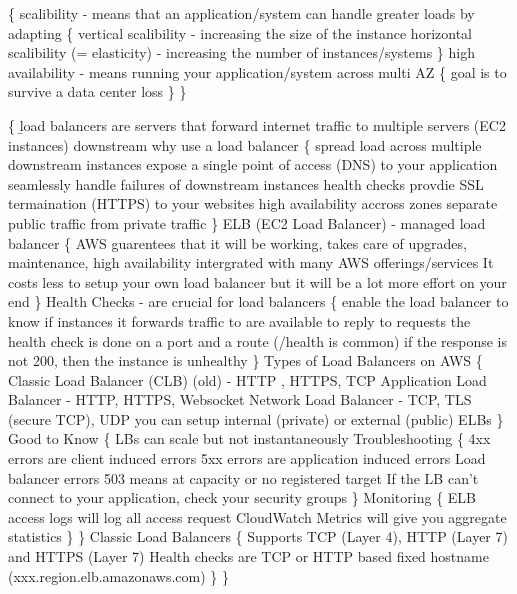  \{
  \> scalibility - means that an application/system can handle greater loads by adapting \{
    \> vertical scalibility - increasing the size of the instance
    \> horizontal scalibility (= elasticity) - increasing the number of instances/systems
  \}
  \> high availability - means running your application/system across multi AZ \{
    \< goal is to survive a data center loss
  \}
  \<
\}

\{
  \> \b{load balancers} are servers that forward internet traffic to multiple servers (EC2 instances) downstream
  \> why use a load balancer \{
    \> spread load across multiple downstream instances
    \> expose a single point of access (DNS) to your application
    \> seamlessly handle failures of downstream instances
    \> health checks
    \> provdie SSL termaination (HTTPS) to your websites
    \> high availability accross zones
    \> separate public traffic from private traffic
    \<
  \}
  \> ELB (EC2 Load Balancer) - managed load balancer \{
    \> AWS guarentees that it will be working, takes care of upgrades, maintenance, high availability
    \> intergrated with many AWS offerings/services
    \> It costs less to setup your own load balancer but it will be a lot more effort on your end 
    \<
  \}
  \> Health Checks - are crucial for load balancers \{
    \> enable the load balancer to know if instances it forwards traffic to are available to reply to requests 
    \> the health check is done on a port and a route (/health is common)
    \> if the response is not 200, then the instance is unhealthy
    \<
  \}
  \> Types of Load Balancers on AWS \{
    \> Classic Load Balancer (CLB) (old) - HTTP , HTTPS, TCP
    \> Application Load Balancer - HTTP, HTTPS, Websocket
    \> Network Load Balancer - TCP, TLS (secure TCP), UDP
    \< 
    \> you can setup internal (private) or external (public) ELBs
    \<
  \}
  \> Good to Know \{
    \> LBs can scale but not instantaneously
    \> Troubleshooting \{
      \> 4xx errors are client induced errors
      \> 5xx errors are application induced errors
      \> Load balancer errors 503 means at capacity or no registered target
      \> If the LB can't connect to your application, check your security groups
    \}
    \> Monitoring \{
      \> ELB access logs will log all access request
      \> CloudWatch Metrics will give you aggregate statistics
      \<
    \}
  \}
  \> Classic Load Balancers \{
    \> Supports TCP (Layer 4), HTTP (Layer 7) and HTTPS (Layer 7)
    \> Health checks are TCP or HTTP based
    \> fixed hostname (xxx.region.elb.amazonaws.com)
  \}
\}
